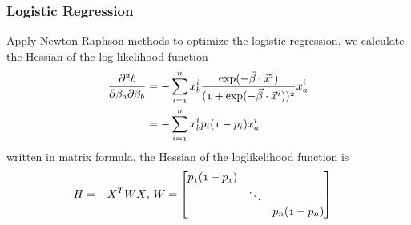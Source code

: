 \documentclass[notheorems, aspectratio=54]{beamer}
\begin{document}
\begin{frame}

\frametitle{Logistic Regression}
Apply Newton-Raphson methods to optimize the logistic regression, we calculate the Hessian of the log-likelihood function
\begin{align*}
\mathnormal{\frac{\partial^2\ell}{\partial\beta_a\partial\beta_b}}
&=\mathnormal{-\sum_{i=1}^{n}x_b^i\frac{\exp(-\vec{\beta}\cdot\vec{x}^i)}{(1+\exp(-\vec{\beta}\cdot\vec{x}^i))^2}x_a^i}\\
&=\mathnormal{-\sum_{i=1}^{n}x_b^i p_i (1-p_i)x_a^i}\\
\end{align*}
written in matrix formula, the Hessian of the loglikelihood function is
\begin{align*}
\mathnormal{{H}}&=\mathnormal{-X^TWX}\text{, } 
\mathnormal{W}=  \begin{bmatrix}
    \mathnormal{p_1 (1-p_1)} & & \\
    & \ddots & \\
    & & \mathnormal{p_n (1-p_n)}
  \end{bmatrix}
\end{align*}
\end{frame}
\end{document}

